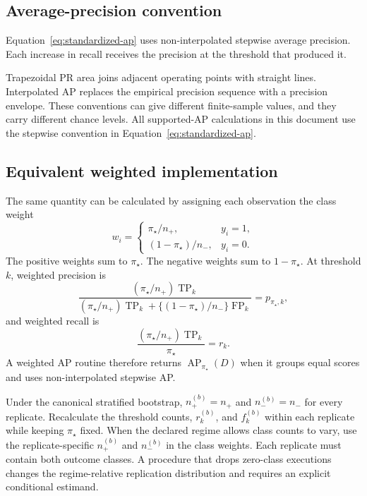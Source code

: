 \documentclass[11pt]{article}
\newcommand{\AP}{\operatorname{AP}}
\theoremstyle{remark}
\begin{document}
\subsection{Average-precision convention}

Equation~\eqref{eq:standardized-ap} uses non-interpolated stepwise average precision. Each increase in recall receives the precision at the threshold that produced it.

Trapezoidal PR area joins adjacent operating points with straight lines. Interpolated AP replaces the empirical precision sequence with a precision envelope. These conventions can give different finite-sample values, and they carry different chance levels. All supported-AP calculations in this document use the stepwise convention in Equation~\eqref{eq:standardized-ap}.

\subsection{Equivalent weighted implementation}

The same quantity can be calculated by assigning each observation the class weight
\begin{equation}
w_i
=
\begin{cases}
\pi_\star/n_+, & y_i=1,\\[4pt]
(1-\pi_\star)/n_-, & y_i=0.
\end{cases}
\label{eq:reference-weights}
\end{equation}
The positive weights sum to $\pi_\star$. The negative weights sum to $1-\pi_\star$. At threshold $k$, weighted precision is
\[
\frac{(\pi_\star/n_+)\operatorname{TP}_k}
{(\pi_\star/n_+)\operatorname{TP}_k
+
\{(1-\pi_\star)/n_-\}\operatorname{FP}_k}
=
p_{\pi_\star,k},
\]
and weighted recall is
\[
\frac{(\pi_\star/n_+)\operatorname{TP}_k}{\pi_\star}
=
r_k.
\]
A weighted AP routine therefore returns $\AP_{\pi_\star}(D)$ when it groups equal scores and uses non-interpolated stepwise AP.

Under the canonical stratified bootstrap, $n_+^{(b)}=n_+$ and $n_-^{(b)}=n_-$ for every replicate. Recalculate the threshold counts, $r_k^{(b)}$, and $f_k^{(b)}$ within each replicate while keeping $\pi_\star$ fixed. When the declared regime allows class counts to vary, use the replicate-specific $n_+^{(b)}$ and $n_-^{(b)}$ in the class weights. Each replicate must contain both outcome classes. A procedure that drops zero-class executions changes the regime-relative replication distribution and requires an explicit conditional estimand.
\end{document}
